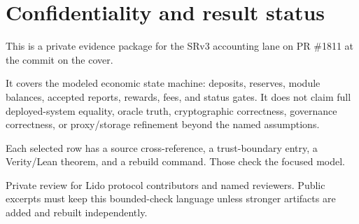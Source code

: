\section*{Confidentiality and result status}

This is a private evidence package for the SRv3 accounting lane on PR \#1811
at the commit on the cover.

It covers the modeled economic state machine: deposits, reserves, module
balances, accepted reports, rewards, fees, and status gates. It does not claim
full deployed-system equality, oracle truth, cryptographic correctness,
governance correctness, or proxy/storage refinement beyond the named
assumptions.

Each selected row has a source cross-reference, a trust-boundary entry, a
Verity/Lean theorem, and a rebuild command. Those check the focused model.

\begin{notebox}
Private review for Lido protocol contributors and named reviewers. Public
excerpts must keep this bounded-check language unless stronger artifacts are
added and rebuilt independently.
\end{notebox}
